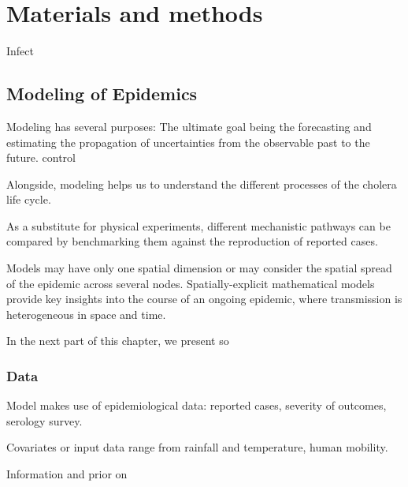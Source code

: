 

\chapter[Materials and methods]{Materials and methods} %

Infect

\section{Modeling of Epidemics}
Modeling has several purposes:
The ultimate goal being  the forecasting and estimating the propagation of uncertainties from the observable past to the future. control

Alongside, modeling helps us to understand the different processes of the cholera life cycle. 

As a substitute for physical experiments, different mechanistic pathways can be compared by benchmarking them against the reproduction of reported cases. 

Models may have only one spatial dimension or may consider the spatial spread of the epidemic across several nodes. Spatially-explicit mathematical models provide key insights into the course of an ongoing epidemic, where transmission is heterogeneous in space and time.



In the next part of this chapter, we present so

\subsection{Data}
Model makes use of epidemiological data: reported cases, severity of outcomes, serology survey. 

Covariates or input data range from rainfall and temperature, human mobility.

Information and prior on



